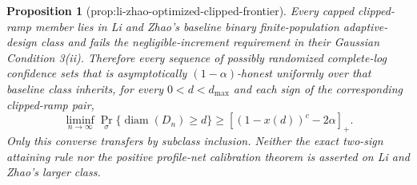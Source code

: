 \documentclass{article}
\newtheorem{proposition}{Proposition}
\begin{document}
\begin{proposition}[prop:li-zhao-optimized-clipped-frontier]\label{prop:li-zhao-optimized-clipped-frontier}
Every capped clipped-ramp member lies in Li and Zhao's baseline binary finite-population adaptive-design class and fails the negligible-increment requirement in their Gaussian Condition 3(ii). Therefore every sequence of possibly randomized complete-log confidence sets that is asymptotically \((1-\alpha)\)-honest uniformly over that baseline class inherits, for every \(0<d<d_{\max}\) and each sign of the corresponding clipped-ramp pair,
\[
 \liminf_{n\to\infty}
 \Pr_\sigma\{\operatorname{diam}(D_n)\ge d\}
 \ge[(1-x(d))^c-2\alpha]_+.
\]
Only this converse transfers by subclass inclusion. Neither the exact two-sign attaining rule nor the positive profile-net calibration theorem is asserted on Li and Zhao's larger class.
\end{proposition}
\end{document}

